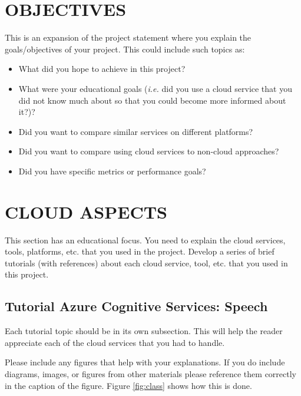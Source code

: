 \documentclass[a4paper,twoside]{article}
\begin{document}
\section{\uppercase{Objectives}}
\label{sec:objectives}

\noindent This is an expansion of the project statement where you explain the goals/objectives of your project. This could include such topics as:
\begin{itemize}
	\item What did you hope to achieve in this project?
	\item What were your educational goals ({\it i.e.} did you use a cloud service that you did not know much about so that you could become more informed about it?)?
	\item Did you want to compare similar services on different platforms?
	\item Did you want to compare using cloud services to non-cloud approaches?
	\item Did you have specific metrics or performance goals?
\end{itemize}

\section{\uppercase{Cloud Aspects}
\label{sec:cloudaspects}}

\noindent This section has an educational focus.  You need to explain the cloud services, tools, platforms, etc. that you used in the project.  Develop a series of brief tutorials (with references) about each cloud service, tool, etc. that you used in this project.  

\subsection{Tutorial Azure Cognitive Services: Speech}
\label{sec:azure}

\noindent Each tutorial topic should be in its own subsection.  This will help the reader appreciate each of the cloud services that you had to handle.

Please include any figures that help with your explanations.  If you do include diagrams, images, or figures from other materials please reference them correctly in the caption of the figure.  Figure \ref{fig:class} shows how this is done.
\end{document}
